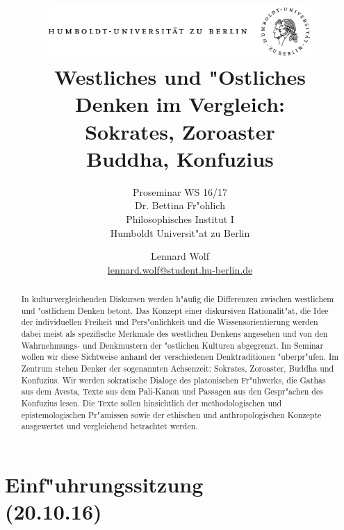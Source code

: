 \documentclass[]{scrartcl}
\begin{document}
\title{
	\includegraphics*[width=0.75\textwidth]{images/hu_logo.png}\\
	\vspace{24pt}
	Westliches und "Ostliches\\Denken im Vergleich:\\Sokrates, Zoroaster\\Buddha, Konfuzius}
\subtitle{Proseminar WS 16/17\\
          Dr. Bettina Fr"ohlich\\
          Philosophisches Institut I \\ 
          Humboldt Universit"at zu Berlin}
\author{Lennard Wolf\\
        \href{mailto:lennard.wolf@student.hu-berlin.de}{lennard.wolf@student.hu-berlin.de}}
\maketitle
\begin{abstract}

In kulturvergleichenden Diskursen werden h"aufig die Differenzen zwischen westlichem und "ostlichem Denken betont. Das Konzept einer diskursiven Rationalit"at, die Idee der individuellen Freiheit und Pers"onlichkeit und die Wissensorientierung werden dabei meist als spezifische Merkmale des westlichen Denkens angesehen und von den Wahrnehmungs- und Denkmustern der "ostlichen Kulturen abgegrenzt. Im Seminar wollen wir diese Sichtweise anhand der verschiedenen Denktraditionen "uberpr"ufen. Im Zentrum stehen Denker der sogenannten Achsenzeit: Sokrates, Zoroaster, Buddha und Konfuzius. Wir werden sokratische Dialoge des platonischen Fr"uhwerks, die Gathas aus dem Avesta, Texte aus dem Pali-Kanon und Passagen aus den Gespr"achen des Konfuzius lesen. Die Texte sollen hinsichtlich der methodologischen und epistemologischen Pr"amissen sowie der ethischen und anthropologischen Konzepte ausgewertet und vergleichend betrachtet werden.

\end{abstract}
\newpage

\tableofcontents
\listoffigures
\newpage


\section{Einf"uhrungssitzung\\(20.10.16)}
\end{document}
